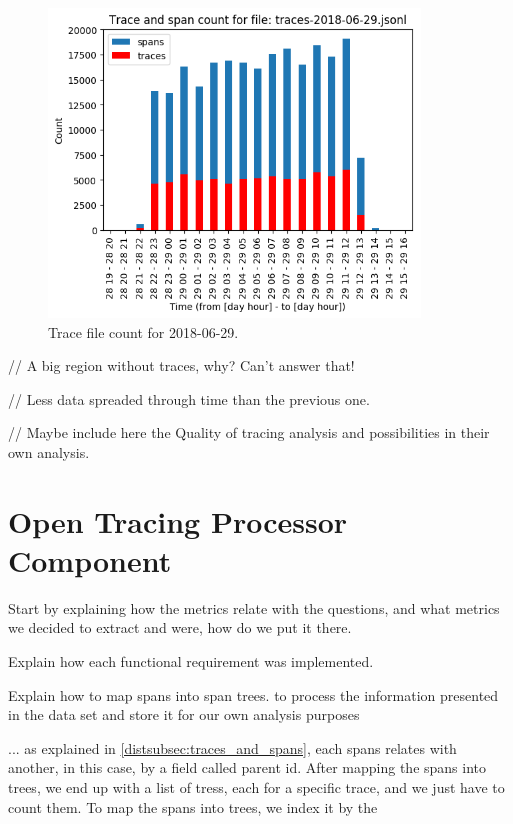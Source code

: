 \begin{figure}[H]
    \centering
    \includegraphics[width=0.88\textwidth]{images/trace_file_count_2018_06_29_chart.png}
    \caption{Trace file count for 2018-06-29.}
    \label{fig:trace_file_count_2018_06_29}
\end{figure}

// A big region without traces, why? Can't answer that!

// Less data spreaded through time than the previous one.

// Maybe include here the Quality of tracing analysis and possibilities in their own analysis.


\section{Open Tracing Processor Component}
\label{sec:open_tracing_processor_component}

Start by explaining how the metrics relate with the questions, and what metrics we decided to extract and were, how do we put it there.

Explain how each functional requirement was implemented.

Explain how to map spans into span trees.
to process the information presented in the data set and store it for our own analysis purposes

... as explained in \ref{distsubsec:traces_and_spans}, each spans relates with another, in this case, by a field called parent id. After mapping the spans into trees, we end up with a list of tress, each for a specific trace, and we just have to count them. To map the spans into trees, we index it by the 

